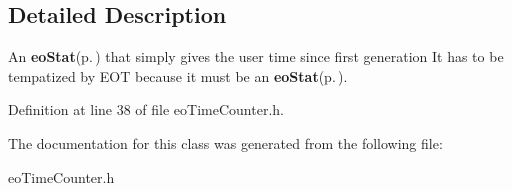 \subsection{Detailed Description}
An {\bf eo\-Stat}{\rm (p.\,\pageref{classeo_stat})} that simply gives the user time since first generation It has to be tempatized by EOT because it must be an {\bf eo\-Stat}{\rm (p.\,\pageref{classeo_stat})}. 



Definition at line 38 of file eo\-Time\-Counter.h.

The documentation for this class was generated from the following file:\begin{CompactItemize}
\item 
eo\-Time\-Counter.h\end{CompactItemize}
